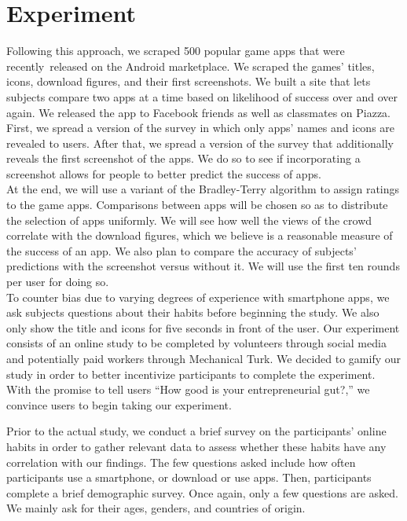 \section{Experiment}


Following this approach, we scraped 500 popular game apps that were recently released on the Android marketplace. We scraped the games' titles, icons, download figures, and their first screenshots. We built a site that lets subjects compare two apps at a time based on likelihood of success over and over again. We released the app to Facebook friends as well as classmates on Piazza. First, we spread a version of the survey in which only apps' names and icons are revealed to users. After that, we spread a version of the survey that additionally reveals the first screenshot of the apps. We do so to see if incorporating a screenshot allows for people to better predict the success of apps. \\

At the end, we will use a variant of the Bradley-Terry algorithm to assign ratings to the game apps. Comparisons between apps will be chosen so as to distribute the selection of apps uniformly. We will see how well the views of the crowd correlate with the download figures, which we believe is a reasonable measure of the success of an app. We also plan to compare the accuracy of subjects' predictions with the screenshot versus without it. We will use the first ten rounds per user for doing so.  \\

To counter bias due to varying degrees of experience with smartphone apps, we ask subjects questions about their habits before beginning the study. We also only show the title and icons for five seconds in front of the user. Our experiment consists of an online study to be completed by volunteers through social media and potentially paid workers through Mechanical Turk. We decided to gamify our study in order to better incentivize participants to complete the experiment. With the promise to tell users “How good is your entrepreneurial gut?,” we convince users to begin taking our experiment.

Prior to the actual study, we conduct a brief survey on the participants' online habits in order to gather relevant data to assess whether these habits have any correlation with our findings. The few questions asked include how often participants use a smartphone, or download or use apps. Then, participants complete a brief demographic survey. Once again, only a few questions are asked. We mainly ask for their ages, genders, and countries of origin.

